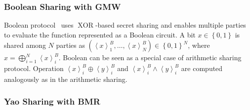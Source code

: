 \subsubsection{Boolean Sharing with GMW}
\label{subsubsec:BooleanSharingwithGMW}
Boolean \gmw protocol~\cite{goldreich1987play} uses $\operatorname{XOR}$-based secret sharing and enables multiple parties to evaluate the function represented as a Boolean circuit. A bit $x\in\left\{0,1\right\} $ is shared among $N$ parties as $\left(\left\langle x\right\rangle ^B_1, \ldots,\left\langle x\right\rangle ^B_N \right) \in \left\{0,1\right\}^N$, where $x=\bigoplus _{i=1}^N \left\langle x\right\rangle ^B_i$. Boolean \gmw can be seen as a special case of arithmetic sharing protocol. Operation $\left\langle x\right\rangle^B_i \oplus  \left\langle y\right\rangle^B_i $ and $\left\langle x\right\rangle^B_i \land\left\langle y\right\rangle^B_i$ are computed analogously as in the arithmetic sharing.

\subsubsection{Yao Sharing with BMR}
\label{subsubsec:YaoSharingwithBMR}




